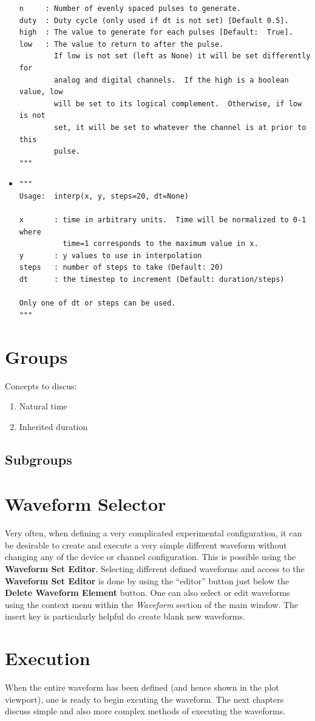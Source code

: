 \begin{itemize}
\begin{lstlisting}
n     : Number of evenly spaced pulses to generate.
duty  : Duty cycle (only used if dt is not set) [Default 0.5].
high  : The value to generate for each pulses [Default:  True].
low   : The value to return to after the pulse.
        If low is not set (left as None) it will be set differently for
        analog and digital channels.  If the high is a boolean value, low
        will be set to its logical complement.  Otherwise, if low is not
        set, it will be set to whatever the channel is at prior to this
        pulse.
"""
\end{lstlisting}

\item {}
\begin{lstlisting}
"""
Usage:  interp(x, y, steps=20, dt=None)

x       : time in arbitrary units.  Time will be normalized to 0-1 where
          time=1 corresponds to the maximum value in x.
y       : y values to use in interpolation
steps   : number of steps to take (Default: 20)
dt      : the timestep to increment (Default: duration/steps)

Only one of dt or steps can be used.
"""
\end{lstlisting}
\end{itemize}


\section{Groups}\label{sec:waveforms:groups}

Concepts to discus:
\begin{enumerate}
  \item Natural time
  \item Inherited duration
\end{enumerate}

\subsection{Subgroups}




\section{Waveform Selector}
Very often, when defining a very complicated experimental configuration, it can
be desirable to create and execute a very simple different waveform without
changing any of the device or channel configuration.  This is possible using the
\textbf{Waveform Set Editor}.  Selecting different defined waveforms and access
to the \textbf{Waveform Set Editor} is done by using the ``editor'' button just
below the \textbf{Delete Waveform Element} button.  One can also select or edit
waveforms using the context menu within the \textit{Waveform} section of the
main window.  The insert key is particularly helpful do create blank new waveforms.


\section{Execution}
When the entire waveform has been defined (and hence shown in the plot
viewport), one is ready to begin excuting the waveform.  The next chapters
discuss simple and also more complex methods of executing the waveforms.
